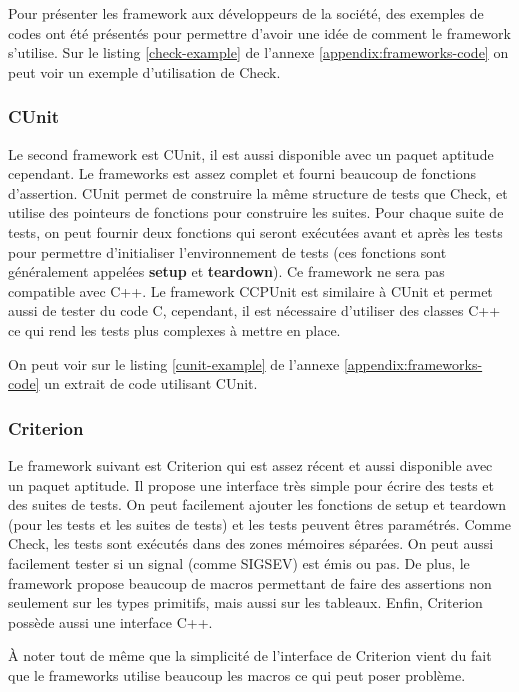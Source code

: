 \documentclass[a4paper]{article}
\begin{document}
Pour présenter les framework aux développeurs de la société, des exemples de
codes ont été présentés pour permettre d'avoir une idée de comment le framework
s'utilise. Sur le listing \ref{check-example} de l'annexe
\ref{appendix:frameworks-code} on peut voir un exemple d'utilisation de Check.

\subsubsection*{CUnit}

Le second framework est CUnit, il est aussi disponible avec un paquet aptitude
cependant. Le frameworks est assez complet et fourni beaucoup de fonctions
d'assertion. CUnit permet de construire la même structure de tests que Check, et
utilise des pointeurs de fonctions pour construire les suites. Pour chaque suite
de tests, on peut fournir deux fonctions qui seront exécutées avant et après les
tests pour permettre d'initialiser l'environnement de tests (ces fonctions sont
généralement appelées \textbf{setup} et \textbf{teardown}). Ce framework ne sera
pas compatible avec C++. Le framework CCPUnit est similaire à CUnit et permet
aussi de tester du code C, cependant, il est nécessaire d'utiliser des classes
C++ ce qui rend les tests plus complexes à mettre en place.

On peut voir sur le listing \ref{cunit-example} de l'annexe
\ref{appendix:frameworks-code} un extrait de code utilisant CUnit.

\subsubsection*{Criterion}

Le framework suivant est Criterion qui est assez récent et aussi disponible avec
un paquet aptitude. Il propose une interface très simple pour écrire des tests
et des suites de tests. On peut facilement ajouter les fonctions de setup et
teardown (pour les tests et les suites de tests) et les tests peuvent êtres
paramétrés. Comme Check, les tests sont exécutés dans des zones mémoires
séparées. On peut aussi facilement tester si un signal (comme SIGSEV) est émis
ou pas. De plus, le framework propose beaucoup de macros permettant de faire des
assertions non seulement sur les types primitifs, mais aussi sur les tableaux.
Enfin, Criterion possède aussi une interface C++.

À noter tout de même que la simplicité de l'interface de Criterion vient du fait
que le frameworks utilise beaucoup les macros ce qui peut poser problème.
\end{document}
